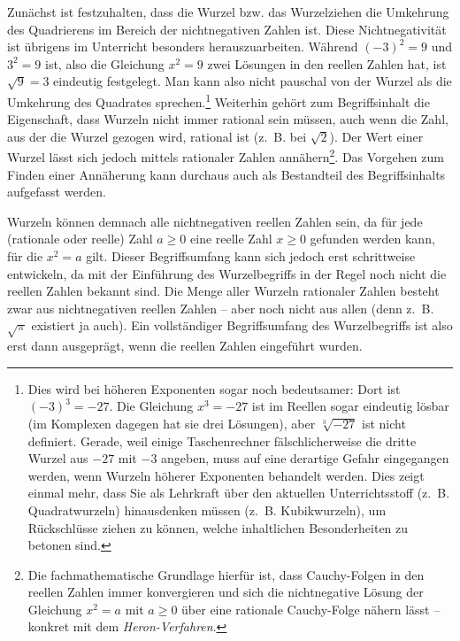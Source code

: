 \documentclass[
]{scrbook}
\theoremstyle{definition}
\theoremstyle{definition}
\theoremstyle{definition}
\theoremstyle{definition}
\theoremstyle{remark}
\begin{document}
Zunächst ist festzuhalten, dass die Wurzel bzw. das Wurzelziehen die Umkehrung des Quadrierens im Bereich der nichtnegativen Zahlen ist. Diese Nichtnegativität ist übrigens im Unterricht besonders herauszuarbeiten. Während \((-3)^2 = 9\) und \(3^2= 9\) ist, also die Gleichung \(x^2 = 9\) zwei Lösungen in den reellen Zahlen hat, ist \(\sqrt{9} = 3\) eindeutig festgelegt. Man kann also nicht pauschal von der Wurzel als die Umkehrung des Quadrates sprechen.\footnote{Dies wird bei höheren Exponenten sogar noch bedeutsamer: Dort ist \((-3)^3 = -27\). Die Gleichung \(x^3 = -27\) ist im Reellen sogar eindeutig lösbar (im Komplexen dagegen hat sie drei Lösungen), aber \(\sqrt[3]{-27}\) ist nicht definiert. Gerade, weil einige Taschenrechner fälschlicherweise die dritte Wurzel aus \(-27\) mit \(-3\) angeben, muss auf eine derartige Gefahr eingegangen werden, wenn Wurzeln höherer Exponenten behandelt werden. Dies zeigt einmal mehr, dass Sie als Lehrkraft über den aktuellen Unterrichtsstoff (z.~B. Quadratwurzeln) hinausdenken müssen (z.~B. Kubikwurzeln), um Rückschlüsse ziehen zu können, welche inhaltlichen Besonderheiten zu betonen sind.} Weiterhin gehört zum Begriffsinhalt die Eigenschaft, dass Wurzeln nicht immer rational sein müssen, auch wenn die Zahl, aus der die Wurzel gezogen wird, rational ist (z.~B. bei \(\sqrt{2}\)). Der Wert einer Wurzel lässt sich jedoch mittels rationaler Zahlen annähern\footnote{Die fachmathematische Grundlage hierfür ist, dass Cauchy-Folgen in den reellen Zahlen immer konvergieren und sich die nichtnegative Lösung der Gleichung \(x^2 = a\) mit \(a\geq 0\) über eine rationale Cauchy-Folge nähern lässt -- konkret mit dem \emph{Heron-Verfahren}.}. Das Vorgehen zum Finden einer Annäherung kann durchaus auch als Bestandteil des Begriffsinhalts aufgefasst werden.

Wurzeln können demnach alle nichtnegativen reellen Zahlen sein, da für jede (rationale oder reelle) Zahl \(a\geq 0\) eine reelle Zahl \(x\geq 0\) gefunden werden kann, für die \(x^2 = a\) gilt. Dieser Begriffsumfang kann sich jedoch erst schrittweise entwickeln, da mit der Einführung des Wurzelbegriffs in der Regel noch nicht die reellen Zahlen bekannt sind. Die Menge aller Wurzeln rationaler Zahlen besteht zwar aus nichtnegativen reellen Zahlen -- aber noch nicht aus allen (denn z.~B. \(\sqrt{\pi}\) existiert ja auch). Ein vollständiger Begriffsumfang des Wurzelbegriffs ist also erst dann ausgeprägt, wenn die reellen Zahlen eingeführt wurden.
\end{document}
